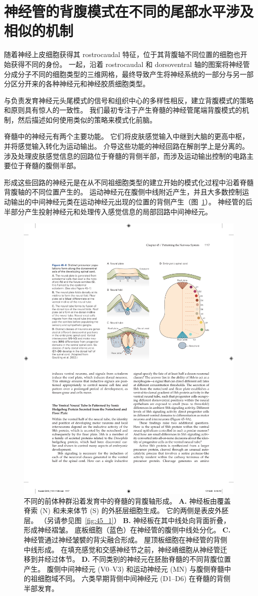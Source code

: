 \section{神经管的背腹模式在不同的尾部水平涉及相似的机制}

随着神经上皮细胞获得其 rostrocaudal 特征，位于其背腹轴不同位置的细胞也开始获得不同的身份。
一起，沿着 rostrocaudal 和 dorsoventral 轴的图案将神经管分成分子不同的细胞类型的三维网格，最终导致产生将神经系统的一部分与另一部分区分开来的各种神经元和神经胶质细胞类型。


与负责发育神经元头尾模式的信号和组织中心的多样性相反，建立背腹模式的策略和原则具有惊人的一致性。
我们最初专注于产生脊髓的神经管尾端背腹模式的机制，然后描述如何使用类似的策略来模式化前脑。


脊髓中的神经元有两个主要功能。
它们将皮肤感觉输入中继到大脑的更高中枢，并将感觉输入转化为运动输出。
介导这些功能的神经回路在解剖学上是分离的。
涉及处理皮肤感觉信息的回路位于脊髓的背侧半部，而涉及运动输出控制的电路主要位于脊髓的腹侧半部。


形成这些回路的神经元是在从不同祖细胞类型的建立开始的模式化过程中沿着脊髓背腹轴的不同位置产生的。
运动神经元在腹侧中线附近产生，并且大多数控制运动输出的中间神经元类在运动神经元出现的位置的背侧产生（图~\ref{fig:45_8}）。
神经管的后半部分产生投射神经元和处理传入感觉信息的局部回路中间神经元。


\begin{figure}[htbp]
	\centering
	\includegraphics[width=0.7\linewidth]{chap45/fig_45_8}
	\caption{不同的前体种群沿着发育中的脊髓的背腹轴形成。
		\textbf{A.} 神经板由覆盖脊索 (N) 和未来体节 (S) 的外胚层细胞生成。
		它的两侧是表皮外胚层。 （另请参见图~\ref{fig:45_1}） 
		\textbf{B.} 神经板在其中线处向背面折叠，形成神经褶皱。
		底板细胞（蓝色）在神经管的腹侧中线处分化。
		\textbf{C.} 神经管通过神经皱襞的背尖融合形成。
		屋顶板细胞在神经管的背侧中线形成。
		在填充感觉和交感神经节之前，神经嵴细胞从神经管迁移到并经过体节。
		\textbf{D.} 不同类别的神经元在胚胎脊髓的不同背腹位置产生。
		腹侧中间神经元 (V0–V3) 和运动神经元 (MN) 与腹侧脊髓中的祖细胞域不同。
		六类早期背侧中间神经元 (D1–D6) 在脊髓的背侧半部发育\cite{goulding2002formation}。}
	\label{fig:45_8}
\end{figure}


